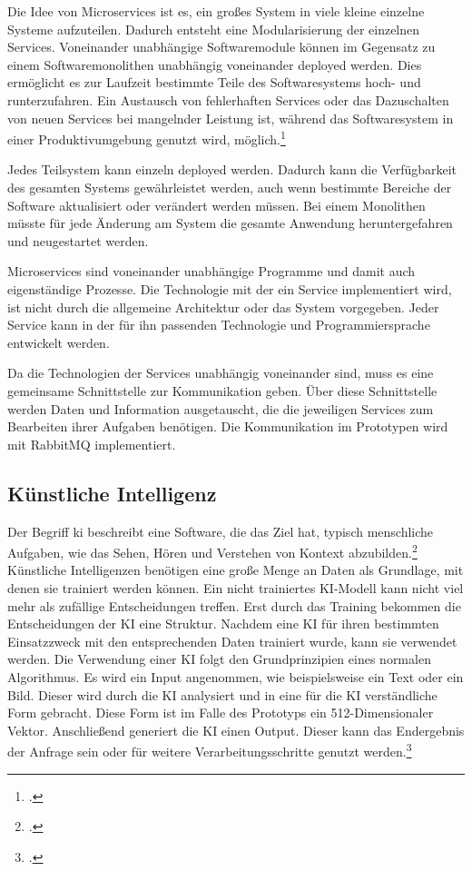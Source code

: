 Die Idee von Microservices ist es, ein großes System in viele kleine einzelne Systeme aufzuteilen. Dadurch entsteht eine Modularisierung der einzelnen Services. Voneinander unabhängige Softwaremodule können im Gegensatz zu einem Softwaremonolithen unabhängig voneinander deployed werden. Dies ermöglicht es zur Laufzeit bestimmte Teile des Softwaresystems hoch- und runterzufahren. Ein Austausch von fehlerhaften Services oder das Dazuschalten von neuen Services bei mangelnder Leistung ist, während das Softwaresystem in einer Produktivumgebung genutzt wird, möglich.\footcite{newman2015microservices}

Jedes Teilsystem kann einzeln deployed werden. Dadurch kann die Verfügbarkeit des gesamten Systems gewährleistet werden, auch wenn bestimmte Bereiche der Software aktualisiert oder verändert werden müssen. Bei einem Monolithen müsste für jede Änderung am System die gesamte Anwendung heruntergefahren und neugestartet werden.  

Microservices sind voneinander unabhängige Programme und damit auch eigenständige Prozesse. Die Technologie mit der ein Service implementiert wird, ist nicht durch die allgemeine Architektur oder das System vorgegeben. Jeder Service kann in der für ihn passenden Technologie und Programmiersprache entwickelt werden. 

Da die Technologien der Services unabhängig voneinander sind, muss es eine gemeinsame Schnittstelle zur Kommunikation geben. Über diese Schnittstelle werden Daten und Information ausgetauscht, die die jeweiligen Services zum Bearbeiten ihrer Aufgaben benötigen. Die Kommunikation im Prototypen wird mit RabbitMQ implementiert. 

\subsection{Künstliche Intelligenz}
Der Begriff \ac{ki} beschreibt eine Software, die das Ziel hat, typisch menschliche Aufgaben, wie das Sehen, Hören und Verstehen von Kontext abzubilden.\footcite{gorz2010handbuch} 
Künstliche Intelligenzen benötigen eine große Menge an Daten als Grundlage, mit denen sie trainiert werden können. Ein nicht trainiertes KI-Modell kann nicht viel mehr als zufällige Entscheidungen treffen. Erst durch das Training bekommen die Entscheidungen der KI eine Struktur. Nachdem eine KI für ihren bestimmten Einsatzzweck mit den entsprechenden Daten trainiert wurde, kann sie verwendet werden. Die Verwendung einer KI folgt den Grundprinzipien eines normalen Algorithmus. Es wird ein Input angenommen, wie beispielsweise ein Text oder ein Bild. Dieser wird durch die KI analysiert und in eine für die KI verständliche Form gebracht. Diese Form ist im Falle des Prototyps ein 512-Dimensionaler Vektor. Anschließend generiert die KI einen Output. Dieser kann das Endergebnis der Anfrage sein oder für weitere Verarbeitungsschritte genutzt werden.\footcite{hamet2017artificial}

